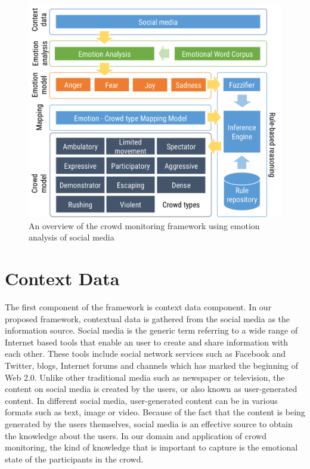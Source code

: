 \begin{figure}[htb!] 
\centering    
\includegraphics[width=1.0\textwidth]{FrameworkOverview}
\caption{An overview of the crowd monitoring framework using emotion analysis of social media}
\label{fig:frameworkOverview}
\end{figure}

\section{Context Data}
The first component of the framework is context data component. In our proposed framework, contextual data is gathered from the social media as the information source. Social media is the generic term referring to a wide range of Internet based tools that enable an user to create and share information with each other. These tools include social network services such as Facebook and Twitter, blogs, Internet forums and channels which has marked the beginning of Web 2.0. Unlike other traditional media such as newspaper or television, the content on social media is created by the users, or also known as user-generated content. In different social media, user-generated content can be in various formats such as text, image or video. Because of the fact that the content is being generated by the users themselves, social media is an effective source to obtain the knowledge about the users. In our domain and application of crowd monitoring, the kind of knowledge that is important to capture is the emotional state of the participants in the crowd. 

